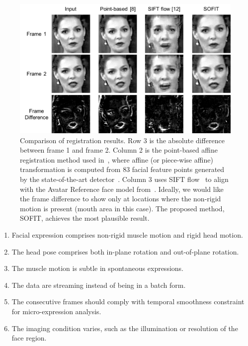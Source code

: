 \documentclass[10pt,journal]{IEEEtran}
\begin{document}
\begin{figure}[!t]
	\centering
		\includegraphics[width=\columnwidth]{fig/regComp.png}
	\caption{Comparison of registration results. Row 3 is the absolute difference between frame 1 and frame 2. Column 2 is the point-based affine registration method used in~\cite{Littlewort_CERT_FG2011,Tadas_ECCV14,Valstar_SMCB12,IntraFace,McDuff_TAC14}, where affine (or piece-wise affine) transformation is computed from 83 facial feature points generated by the state-of-the-art detector~\cite{Tadas_ECCV14}. Column 3 uses SIFT flow~\cite{Liu_PAMI11} to align with the Avatar Reference face model from~\cite{Yang_SMCB12}. Ideally, we would like the frame difference to show only at locations where the non-rigid motion is present (mouth area in this case). The proposed method, SOFIT, achieves the most plausible result.}
	\label{fig:regComp}
\end{figure}

\begin{enumerate}
\item Facial expression comprises non-rigid muscle motion and rigid head motion.
\item The head pose comprises both in-plane rotation and out-of-plane rotation.
\item The muscle motion is subtle in spontaneous expressions.
\item The data are streaming instead of being in a batch form.
\item The consecutive frames should comply with temporal smoothness constraint for micro-expression analysis.
\item The imaging condition varies, such as the illumination or resolution of the face region.
\end{enumerate}
\end{document}
